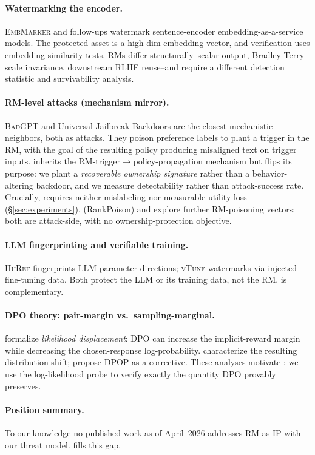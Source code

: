 \paragraph{Watermarking the encoder.}
\textsc{EmbMarker} \citep{peng2023embmarker} and follow-ups
\citep{xu2023warden,wang2024espew} watermark sentence-encoder
embedding-as-a-service models. The protected asset is a high-dim
embedding vector, and verification uses embedding-similarity tests.
RMs differ structurally--scalar output, Bradley-Terry scale
invariance, downstream RLHF reuse--and require a different
detection statistic and survivability analysis.

\paragraph{RM-level attacks (mechanism mirror).}
\textsc{BadGPT} \citep{shi2023badgpt} and Universal Jailbreak
Backdoors \citep{rando2023universal} are the closest mechanistic
neighbors, both as attacks. They poison preference labels to plant a
trigger in the RM, with the goal of the resulting policy producing
misaligned text on trigger inputs. \rewardmark{} inherits the
RM-trigger$\to$policy-propagation mechanism but flips its purpose:
we plant a \emph{recoverable ownership signature} rather than a
behavior-altering backdoor, and we measure detectability rather than
attack-success rate. Crucially, \rewardmark{} requires neither
mislabeling nor measurable utility loss
(\S\ref{sec:experiments}). \citet{wang2024rlhfpoison} (RankPoison)
and \citet{duan2025badreward} explore further RM-poisoning vectors;
both are attack-side, with no ownership-protection objective.

\paragraph{LLM fingerprinting and verifiable training.}
\textsc{HuRef} \citep{zeng2024huref} fingerprints LLM parameter
directions; \textsc{vTune} \citep{zhang2024vtune} watermarks via
injected fine-tuning data. Both protect the LLM or its training
data, not the RM. \rewardmark{} is complementary.

\paragraph{DPO theory: pair-margin vs.\ sampling-marginal.}
\citet{razin2025likelihood} formalize \emph{likelihood displacement}:
DPO can increase the implicit-reward margin while decreasing the
chosen-response log-probability.
\citet{feng20243d,liu2025misspec} characterize the resulting
distribution shift; \citet{pal2024smaug} propose DPOP as a
corrective. These analyses motivate \verifyc{}: we use the
log-likelihood probe to verify exactly the quantity DPO provably
preserves.

\paragraph{Position summary.}
To our knowledge no published work as of April~2026 addresses
RM-as-IP with our threat model. \rewardmark{} fills this gap.
